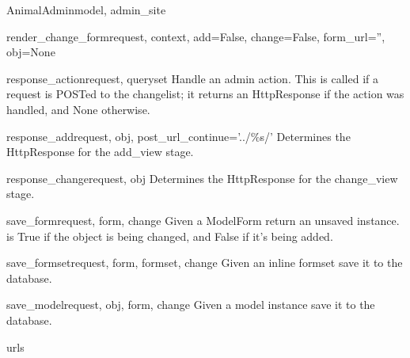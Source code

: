 \documentclass[letterpaper,10pt,english]{sphinxmanual}
\begin{document}
\begin{classdesc}{AnimalAdmin}{model, admin\_site}
\hypertarget{animal.admin.AnimalAdmin.render_change_form}{}\begin{methoddesc}{render\_change\_form}{request, context, add=False, change=False, form\_url='', obj=None}\end{methoddesc}

\hypertarget{animal.admin.AnimalAdmin.response_action}{}\begin{methoddesc}{response\_action}{request, queryset}
Handle an admin action. This is called if a request is POSTed to the
changelist; it returns an HttpResponse if the action was handled, and
None otherwise.
\end{methoddesc}

\hypertarget{animal.admin.AnimalAdmin.response_add}{}\begin{methoddesc}{response\_add}{request, obj, post\_url\_continue='../\%s/'}
Determines the HttpResponse for the add\_view stage.
\end{methoddesc}

\hypertarget{animal.admin.AnimalAdmin.response_change}{}\begin{methoddesc}{response\_change}{request, obj}
Determines the HttpResponse for the change\_view stage.
\end{methoddesc}

\hypertarget{animal.admin.AnimalAdmin.save_form}{}\begin{methoddesc}{save\_form}{request, form, change}
Given a ModelForm return an unsaved instance.  is True if
the object is being changed, and False if it's being added.
\end{methoddesc}

\hypertarget{animal.admin.AnimalAdmin.save_formset}{}\begin{methoddesc}{save\_formset}{request, form, formset, change}
Given an inline formset save it to the database.
\end{methoddesc}

\hypertarget{animal.admin.AnimalAdmin.save_model}{}\begin{methoddesc}{save\_model}{request, obj, form, change}
Given a model instance save it to the database.
\end{methoddesc}

\hypertarget{animal.admin.AnimalAdmin.urls}{}\begin{memberdesc}{urls}\end{memberdesc}
\end{classdesc}
\end{document}
